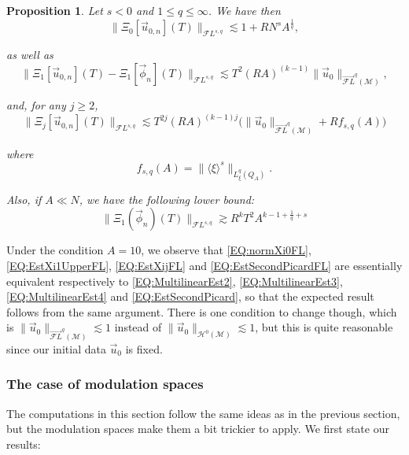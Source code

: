 \documentclass[letterpaper, 11pt,  reqno]{amsart}
\newtheorem{proposition}[theorem]{Proposition}
\newcommand{\1}{\hspace{0.5mm}\text{I}\hspace{0.5mm}}
\newcommand{\noi}{\noindent}
\newcommand{\M}{\mathcal{M}}
\newcommand{\FL}{\mathcal{F}L} %
\newcommand{\FLv}{\overrightarrow{\mathcal{F}L}}
\renewcommand{\H}{\mathcal{H}}
\newcommand{\les}{\lesssim}
\newcommand{\ges}{\gtrsim}
\newcommand{\jb}[1]
{\langle #1 \rangle}
\numberwithin{equation}{section}
\numberwithin{theorem}{section}
\begin{document}
\begin{proposition}
\label{PROP:EstforFL}
Let $s < 0$ and $1 \leq q \leq \infty$. We have then 
\begin{equation}
\label{EQ:normXi0FL}
\| \Xi_0 [\vec{u}_{0, n}](T) \|_{\FL^{s,q}} \les 1 + R N^s A^{\frac 1q},
\end{equation}

\noi as well as
\begin{equation}
\label{EQ:EstXi1UpperFL}
\|\Xi_1 [\vec{u}_{0, n}] (T) - \Xi_1 [\vec{\phi}_{ n}] (T)  \|_{\FL^{s,q}} \les T^{2} (RA)^{(k-1)} \| \vec{u}_0 \|_{\FLv^{q}( \M)},
\end{equation}


\noi and, for any $j \geq 2$, 
\begin{equation}
\label{EQ:EstXijFL}
\|\Xi_j [\vec{u}_{0, n}] (T) \|_{\FL^{s,q}} \les T^{2j} (RA)^{(k-1)j} \big( \| \vec{u}_0 \|_{\FLv^{q}( \M)} + Rf_{s,q} (A) \big)
\end{equation}

\noi where
\begin{equation}
\label{EQ:deffsqFL}
f_{s,q}(A) = \| \jb{\xi}^s \|_{L^q_\xi (Q_A) }.
\end{equation}

\noi Also, if $A \ll N$, we have the following lower bound:
\begin{equation}
\label{EQ:EstSecondPicardFL}
\| \Xi_1 (\vec{\phi}_n) (T) \|_{ \FL^{s,q}} \ges R^k T^2 A^{k - 1 + \frac 1q + s}
\end{equation}
\end{proposition}

\noi Under the condition $A = 10$, we observe that \eqref{EQ:normXi0FL}, \eqref{EQ:EstXi1UpperFL}, \eqref{EQ:EstXijFL} and \eqref{EQ:EstSecondPicardFL} are essentially equivalent respectively to \eqref{EQ:MultilinearEst2}, \eqref{EQ:MultilinearEst3}, \eqref{EQ:MultilinearEst4} and \eqref{EQ:EstSecondPicard}, so that the expected result follows from the same argument. There is one condition to change though, which is $\| \vec{u}_0 \|_{\FLv^{q}( \M)}  \les 1$ instead of $\| \vec{u}_0 \|_{\H^0 ( \M)} \les 1$, but this is quite reasonable since our initial data $\vec{u}_0$ is fixed.


\subsubsection{The case of modulation spaces}

The computations in this section follow the same ideas as in the previous section, but the modulation spaces make them a bit trickier to apply. We first state our results:
\end{document}
